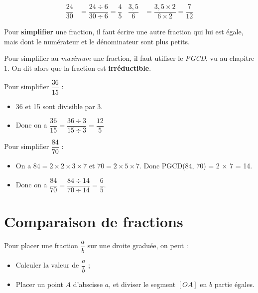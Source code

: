 \documentclass[a4paper,11pt]{article}
\begin{document}
\begin{exemple}
	\begin{align*}
		\dfrac{24}{30} & = \dfrac{24 ÷ 6}{30 ÷ 6} = \dfrac{4}{5}  &
		\dfrac{3,5}{6} & = \dfrac{3,5 × 2}{6 × 2} = \dfrac{7}{12}
	\end{align*}
\end{exemple}

\begin{cours}
	Pour \textbf{simplifier} une fraction, il faut écrire une autre fraction qui lui est égale, mais dont le numérateur et le dénominateur sont plus petits.

	Pour simplifier au \textit{maximum} une fraction, il faut utiliser le \textit{PGCD}, vu au chapitre 1. On dit alors que la fraction est \textbf{irréductible}.
\end{cours}

\begin{exemple}
	Pour simplifier $\dfrac{36}{15}$ :
	\begin{itemize}
		\item 36 et 15 sont divisible par 3.
		\item Donc on a $\dfrac{36}{15} = \dfrac{36 ÷ 3}{15 ÷ 3} = \dfrac{12}{5}$
	\end{itemize}
\end{exemple}

\begin{exemple}	
	Pour simplifier $\dfrac{84}{70}$ :
	\begin{itemize}
		\item On a $84 = 2 × 2 × 3 × 7$ et $70 = 2 × 5 × 7$. Donc PGCD(84, 70) = 2 × 7 = 14.
		\item Donc on a $\dfrac{84}{70} = \dfrac{84 ÷ 14}{70 ÷ 14} = \dfrac{6}{5}$.
	\end{itemize}
\end{exemple}

\section{Comparaison de fractions}

\begin{cours}
	Pour placer une fraction $\dfrac{a}{b}$ sur une droite graduée, on peut :
	\begin{itemize}
		\item Calculer la valeur de $\dfrac{a}{b}$ ;
		\item Placer un point $A$ d'abscisse $a$, et diviser le segment $[OA]$ en $b$ partie égales.
	\end{itemize}
\end{cours}
\end{document}
